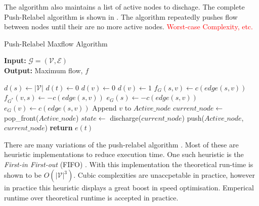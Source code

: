 The algorithm also maintains a list of active nodes to dischage. The complete Push-Relabel algorithm is shown in . The algorithm repeatedly pushes flow between nodes until their are no more active nodes.
\textcolor{red}{Worst-case Complexity, etc.}

\begin{algorithm}[!t]
	\caption{Push-Relabel Maxflow Algorithm}\label{alg:pushrelabelcomplete}
	\textbf{Input:} $\mathcal{G}=(\mathcal{V},\mathcal{E})$\\
	\textbf{Output:} Maximum flow, $f$
	\begin{algorithmic}[1]
		\State $d(s) \gets |\mathcal{V}|$
		\State $d(t) \gets 0$
		\State $d(v) \gets 0$
		\EndFor
		\State $d(v) \gets 1$
		\State $f_{G}(s,v) \gets c(edge (s,v))$
		\State $f_{G^*}(v,s) \gets -c(edge (s,v))$
		\State $e_G(s) \gets -c(edge (s,v))$
		\State $e_G(v) \gets c(edge (s,v))$
		\State Append $v$ to $Active\_node$
		\EndFor
		\State $current\_node \gets$ pop\_front($Active\_node$)
		\State $state \gets$ discharge($current\_node$)
		\State push($Active\_node$,$current\_node$)
		\EndIf
		\EndWhile
		\State \textbf{return} $e(t)$
		\EndProcedure
	\end{algorithmic}
\end{algorithm}

There are many variations of the push-relabel algorithm \citep{Cherkassky1997,Goldberg1988}. Most of these are heuristic implementations to reduce execution time. One such heuristic is the \textit{First-in First-out} (FIFO) \citep{Goldberg1988}. With this implementation the theoretical run-time is shown to be $O(|\mathcal{V}|^3)$. Cubic complexities are unaccpetable in practice, however in practice this heuristic displays a great boost in speed optimisation. Emperical runtime over theoretical runtime is accepted in practice. 


